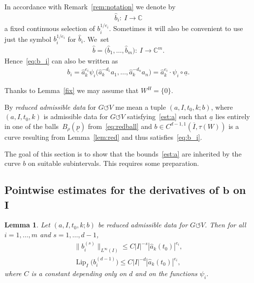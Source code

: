 \documentclass[11pt]{article}
\numberwithin{equation}{section}
\numberwithin{equation}{section}
\newtheorem{Lemma}[Theorem]{Lemma}
\def\rh{\rho}
\def\ta{\tau}
\def\ps{\psi}
\def\C{\mathbb{C}}
\def\ol{\overline}
\def\ul{\underline}
\def\Lip{\on{Lip}}
\def\we{\hat}
\renewcommand{\o}{\circ}
\def\acts{\circlearrowleft}
\let\on=\operatorname
\begin{document}
In accordance with Remark~\ref{rem:notation} we denote by
\begin{gather*}
 \we b_i \colon\ I \to \C
\end{gather*}
a fixed continuous selection of $b_i^{1/e_i}$. Sometimes it will also be convenient to use just the
symbol $b_i^{1/e_i}$ for $\we b_i$. We~set
\begin{gather*}
 \we b = \big(\we b_1,\dots,\we b_m\big) \colon\ I \to \C^m.
\end{gather*}
Hence~\eqref{eq:b_i} can also be written as
\begin{gather*}
 b_i = \we a_k^{e_i} \ps_i \big(\we a_k^{-d_1} a_1, \dots, \we a_k^{-d_n} a_n\big) = \we a_k^{e_i}\cdot \ps_i \o \ul a.
\end{gather*}

Thanks to Lemma~\ref{fix} we may assume that $W^H = \{0\}$.


\begin{Definition}
 By \emph{reduced admissible data} for $G \acts V$ me mean a tuple $(a, I, t_0, k; b)$, where
 $(a, I, t_0, k)$ is admissible data for $G \acts V$
 satisfying~\eqref{est:a}
 such that $\ul a$
 lies entirely in one of the balls~$B_\rh(\underline p)$ from~\eqref{eq:redball}
 and $b \in C^{d-1,1}(\ol I,\ta(W))$ is a curve resulting from Lemma~\ref{lem:red}
 and thus satisfies~\eqref{eq:b_i}.
\end{Definition}


The goal of this section is to show that the bounds~\eqref{est:a} are inherited by the curve $b$ on suitable subintervals.
This requires some preparation.

\subsection[Pointwise estimates for the derivatives of b on I]
{Pointwise estimates for the derivatives of $\boldsymbol b$ on~$\boldsymbol I$}
\begin{Lemma} %
 Let $(a, I, t_0, k; b)$ be reduced admissible data for $G \acts V$.
 Then for all
 $i=1,\dots,m$ and $s = 1,\dots,d-1$,
 \begin{gather}
 \big\| b_i^{(s)} \big\|_{L^\infty(I)} \le C |I|^{-s} |\we a_k (t_0)|^{e_i},\nonumber
 \\
 \Lip_I\big( b_i^{(d-1)}\big) \le C |I|^{-d} |\we a_k (t_0)|^{e_i},
\label{eq:b_ider}
 \end{gather}
 where $C$ is a constant depending only on $d$ and on the functions $\ps_i$.
\end{Lemma}
\end{document}
